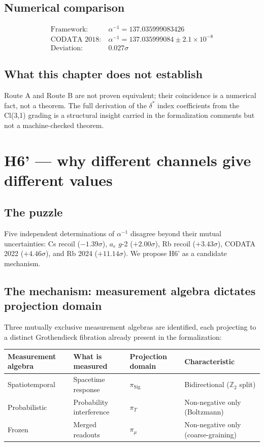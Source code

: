 \documentclass[11pt,twoside]{article}
\begin{document}
\subsection{Numerical comparison}
\[
\begin{aligned}
\text{Framework}:\ &\alpha^{-1} = 137.035999083426 \\
\text{CODATA 2018}:\ &\alpha^{-1} = 137.035999084 \pm 2.1\times 10^{-8} \\
\text{Deviation}:\ &0.027\sigma
\end{aligned}
\]

\subsection{What this chapter does not establish}
Route A and Route B are not proven equivalent; their coincidence is a numerical fact, not a theorem. The full derivation of the $\delta^*$ index coefficients from the Cl(3,1) grading is a structural insight carried in the formalization comments but not a machine-checked theorem.

\section{H6' — why different channels give different values}
\label{sec:h6prime}

\subsection{The puzzle}
Five independent determinations of $\alpha^{-1}$ disagree beyond their mutual uncertainties: Cs recoil ($-1.39\sigma$), $a_e$ $g$-2 ($+2.00\sigma$), Rb recoil ($+3.43\sigma$), CODATA 2022 ($+4.46\sigma$), and Rb 2024 ($+11.14\sigma$). We propose H6' as a candidate mechanism.

\subsection{The mechanism: measurement algebra dictates projection domain}
Three mutually exclusive measurement algebras are identified, each projecting to a distinct Grothendieck fibration already present in the formalization:
\begin{center}
\begin{tabular}{l l l l}
Measurement algebra & What is measured & Projection domain & Characteristic \\
\hline
Spatiotemporal & Spacetime response & $\pi_{\mathrm{Sig}}$ & Bidirectional ($\mathbb{Z}_2$ split) \\
Probabilistic & Probability interference & $\pi_T$ & Non-negative only (Boltzmann) \\
Frozen & Merged readouts & $\pi_\mu$ & Non-negative only (coarse-graining) \\
\end{tabular}
\end{center}
\end{document}
